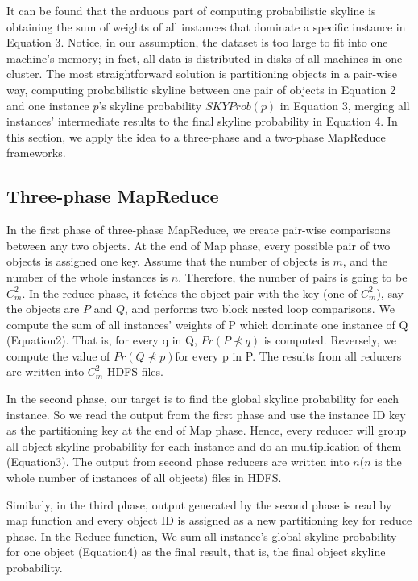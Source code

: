 It can be found that the arduous part of computing probabilistic skyline is obtaining the sum of weights of all instances that dominate a specific instance in Equation 3. Notice, in our assumption, the dataset is too large to fit into one machine's memory; in fact, all data is distributed in disks of all machines in one cluster. The most straightforward solution is partitioning objects in a pair-wise way, computing probabilistic skyline between one pair of objects in Equation 2 and one instance \(p\)'s skyline probability \(SKYProb(p)\) in Equation 3, merging all instances' intermediate results to the final skyline probability in Equation 4. In this section, we apply the idea to a three-phase and a two-phase MapReduce frameworks.


\subsection{Three-phase MapReduce}
In the first phase of three-phase MapReduce, we create pair-wise comparisons between any two objects. At the end of Map phase, every possible pair of two objects is assigned one key. Assume that the number of objects is \(m\), and the number of the whole instances is \(n\). Therefore, the number of pairs is going to be \(C_{m}^{2}\). In the reduce phase, it fetches the object pair with the key (one of \(C_{m}^{2}\)), say the objects are \(P\) and \(Q\), and performs two block nested loop comparisons. We compute the sum of all instances' weights of P which dominate one instance of Q (Equation2). That is, for every q in Q, $Pr( P\nprec q) $ is computed. Reversely, we compute the value of $Pr( Q\nprec p) $for every p in P.  The results from all reducers are written into \(C_{m}^{2}\) HDFS files.


In the second phase, our target is to find the global skyline probability for each instance. So we read the output from the first phase and use the instance ID key as the partitioning key at the end of Map phase. Hence, every reducer will group all object skyline probability for each instance and do an multiplication of them (Equation3). The output from second phase reducers are written into \(n\)(\(n\) is the whole number of instances of all objects) files in HDFS.

Similarly, in the third phase, output generated by the second phase is read by map function and every object ID is assigned as a new partitioning key for reduce phase. In the Reduce function, We sum all instance's global skyline probability for one object (Equation4) as the final result, that is, the final object skyline probability.

